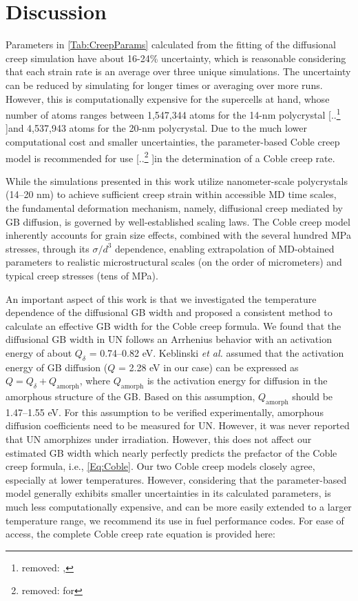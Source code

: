 \documentclass[preprint,12pt,sort&compress]{elsarticle} %
\newcommand{\?}{\stackrel{?}{=}}
\providecommand{\DIFaddtex}[1]{{\sf #1}} %
\providecommand{\DIFdeltex}[1]{{[..\footnote{removed: #1} ]}} %
\providecommand{\DIFaddbegin}{\protect\color{blue}} %
\providecommand{\DIFaddend}{\protect\color{black}} %
\providecommand{\DIFdelbegin}{\protect\color{red}} %
\providecommand{\DIFdelend}{\protect\color{black}} %
\providecommand{\DIFadd}[1]{\texorpdfstring{\DIFaddtex{#1}}{#1}} %
\providecommand{\DIFdel}[1]{\texorpdfstring{\DIFdeltex{#1}}{}} %
\newcommand{\DIFscaledelfig}{0.5}
\newlength{\DIFdelgraphicswidth} %
\newlength{\DIFdelgraphicsheight} %
\newcommand{\DIFaddincludegraphics}[2][]{{\color{blue}\fbox{\DIFOincludegraphics[#1]{#2}}}} %
\newcommand{\DIFdelincludegraphics}[2][]{%
\sbox{\DIFdelgraphicsbox}{\DIFOincludegraphics[#1]{#2}}%
\settoboxwidth{\DIFdelgraphicswidth}{\DIFdelgraphicsbox} %
\settoboxtotalheight{\DIFdelgraphicsheight}{\DIFdelgraphicsbox} %
\scalebox{\DIFscaledelfig}{%
\parbox[b]{\DIFdelgraphicswidth}{\usebox{\DIFdelgraphicsbox}\\[-\baselineskip] \rule{\DIFdelgraphicswidth}{0em}}\llap{\resizebox{\DIFdelgraphicswidth}{\DIFdelgraphicsheight}{%
\setlength{\unitlength}{\DIFdelgraphicswidth}%
\begin{picture}(1,1)%
\thicklines\linethickness{2pt} %
{\color[rgb]{1,0,0}\put(0,0){\framebox(1,1){}}}%
{\color[rgb]{1,0,0}\put(0,0){\line( 1,1){1}}}%
{\color[rgb]{1,0,0}\put(0,1){\line(1,-1){1}}}%
\end{picture}%
}\hspace*{3pt}}} %
} %
\DeclareRobustCommand{\DIFaddbegin}{\DIFOaddbegin \let\includegraphics\DIFaddincludegraphics} %
\DeclareRobustCommand{\DIFaddend}{\DIFOaddend \let\includegraphics\DIFOincludegraphics} %
\DeclareRobustCommand{\DIFdelbegin}{\DIFOdelbegin \let\includegraphics\DIFdelincludegraphics} %
\DeclareRobustCommand{\DIFdelend}{\DIFOaddend \let\includegraphics\DIFOincludegraphics} %
\begin{document}
\section{Discussion}


Parameters in \cref{Tab:CreepParams} calculated from the fitting of the diffusional creep simulation have about 16-24\% uncertainty\DIFaddbegin \DIFadd{, }\DIFaddend which is reasonable considering that each strain rate is an average over three unique simulations. The uncertainty can be reduced by simulating for longer times or averaging over more runs. However, this is computationally expensive for the supercells at hand\DIFaddbegin \DIFadd{, }\DIFaddend whose number of atoms ranges between 1,547,344 atoms for the 14-nm polycrystal \DIFdelbegin \DIFdel{, }\DIFdelend and 4,537,943 atoms for the 20-nm polycrystal. Due to the much lower computational cost and smaller uncertainties, the parameter-based Coble creep model is recommended for use \DIFdelbegin \DIFdel{for }\DIFdelend \DIFaddbegin \DIFadd{in }\DIFaddend the determination of a Coble creep rate.

\DIFaddbegin \DIFadd{While the simulations presented in this work utilize nanometer-scale polycrystals (14--20 nm) to achieve sufficient creep strain within accessible MD time scales, the fundamental deformation mechanism, namely, diffusional creep mediated by GB diffusion, is governed by well-established scaling laws. The Coble creep model inherently accounts for grain size effects, combined with the several hundred MPa stresses, through its $\sigma/d^{3}$ dependence, enabling extrapolation of MD-obtained parameters to realistic microstructural scales (on the order of micrometers) and typical creep stresses (tens of MPa).
}

\DIFaddend An important aspect of this work is that we investigated the temperature dependence of the diffusional GB width and proposed a consistent method to calculate an effective GB width for the Coble creep formula. We found that the diffusional GB width in UN follows an Arrhenius behavior with an activation energy of about $Q_\delta$ = 0.74--0.82 eV. Keblinski \textit{et al.} \cite{Keblinski1999} assumed that the activation energy of GB diffusion ($Q$ = 2.28 eV in our case) can be expressed as $Q = Q_\delta + Q_\mathrm{amorph}$, where $Q_\mathrm{amorph}$ is the activation energy for diffusion in the amorphous structure of the GB. Based on this assumption, $Q_\mathrm{amorph}$ should be 1.47--1.55 eV. For this assumption to be verified experimentally, amorphous diffusion coefficients need to be measured for UN. However, it was never reported that UN amorphizes under irradiation. However, this does not affect our estimated GB width which nearly perfectly predicts the prefactor of the Coble creep formula, i.e., \cref{Eq:Coble}. Our two Coble creep models closely agree, especially at lower temperatures. However, considering that the parameter-based model generally exhibits smaller uncertainties in its calculated parameters, is much less computationally expensive, and can be more easily extended to a larger temperature range, we recommend its use in fuel performance codes. For ease of access, the complete Coble creep rate equation is provided here:
\end{document}
